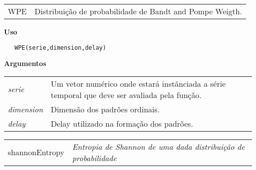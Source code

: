 \documentclass[12pt,letterpaper]{article}
\begin{document}
\hrulefill   

\begin{table}[!h]
\begin{center}
\begin{tabularx}{\textwidth}{X X}
\hspace{0.5cm} WPE & Distribuição de probabilidade de Bandt and Pompe Weigth.\\
\end{tabularx}
\end{center}
\end{table} 

\vspace{-0.5cm}

\hrulefill  

\vspace{0.5cm}

\textbf{Uso}

\begin{lstlisting}
   WPE(serie,dimension,delay)
\end{lstlisting}

\vspace{0.5cm}


\textbf{Argumentos}

\begin{table}[!h]
\begin{center}
\begin{tabularx}{\textwidth}{X X}
\hspace{0.5cm} \textit{serie} \vspace{0.5cm}& Um vetor numérico onde estará instânciada a série temporal que deve ser avaliada pela função.\vspace{0.5cm}\\
\hspace{0.5cm} \textit{dimension} \vspace{0.5cm}& Dimensão dos padrões ordinais.\vspace{0.5cm}\\
\hspace{0.5cm} \textit{delay} & Delay utilizado na formação dos padrões.\\
\end{tabularx}
\end{center}
\end{table} 


\hrulefill   

\begin{table}[!h]
\begin{center}
\begin{tabularx}{\textwidth}{ X X}
  \hspace{0.5cm} shannonEntropy & \textit{Entropia de Shannon de uma dada distribuição de probabilidade}\\
\end{tabularx}
\end{center}
\end{table} 
\end{document}
